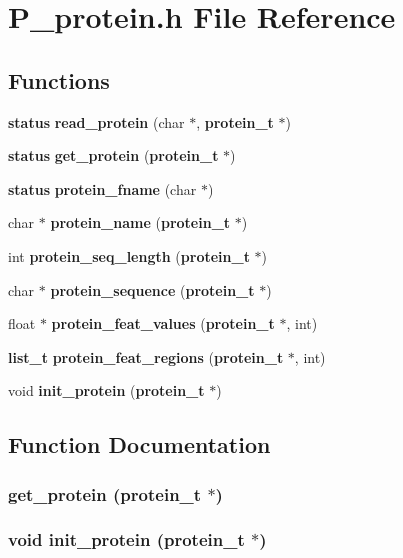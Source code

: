 \section{P\_\-protein.h File Reference}
\label{P__protein_8h}
\subsection*{Functions}
\begin{CompactItemize}
\item 
{\bf status} {\bf read\_\-protein} (char $\ast$, {\bf protein\_\-t} $\ast$)
\item 
{\bf status} {\bf get\_\-protein} ({\bf protein\_\-t} $\ast$)
\item 
{\bf status} {\bf protein\_\-fname} (char $\ast$)
\item 
char $\ast$ {\bf protein\_\-name} ({\bf protein\_\-t} $\ast$)
\item 
int {\bf protein\_\-seq\_\-length} ({\bf protein\_\-t} $\ast$)
\item 
char $\ast$ {\bf protein\_\-sequence} ({\bf protein\_\-t} $\ast$)
\item 
float $\ast$ {\bf protein\_\-feat\_\-values} ({\bf protein\_\-t} $\ast$, int)
\item 
{\bf list\_\-t} {\bf protein\_\-feat\_\-regions} ({\bf protein\_\-t} $\ast$, int)
\item 
void {\bf init\_\-protein} ({\bf protein\_\-t} $\ast$)
\end{CompactItemize}


\subsection{Function Documentation}
\subsubsection{ get\_\-protein ({\bf protein\_\-t} $\ast$)}\label{P__protein_8h_a1}


\subsubsection{\setlength{\rightskip}{0pt plus 5cm}void init\_\-protein ({\bf protein\_\-t} $\ast$)}\label{P__protein_8h_a8}


